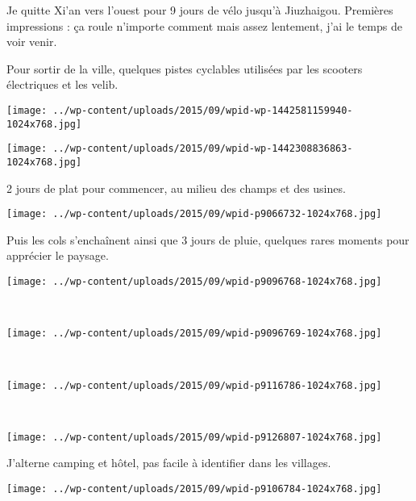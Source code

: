   Je quitte Xi'an vers l'ouest pour 9 jours de vélo jusqu'à Jiuzhaigou. Premières impressions : ça roule n'importe comment mais assez lentement, j'ai le temps de voir venir.

 Pour sortir de la ville, quelques pistes cyclables utilisées par les scooters électriques et les velib.
\begin{center} \texttt{[image: ../wp-content/uploads/2015/09/wpid-wp-1442581159940-1024x768.jpg]} \end{center}
\begin{center} \texttt{[image: ../wp-content/uploads/2015/09/wpid-wp-1442308836863-1024x768.jpg]} \end{center}
\vspace{-\topsep}
\vspace{-1.25mm}
\pagebreak

  2 jours de plat pour commencer, au milieu des champs et des usines.
\begin{center} \texttt{[image: ../wp-content/uploads/2015/09/wpid-p9066732-1024x768.jpg]} \end{center}

 Puis les cols s'enchaînent ainsi que 3 jours de pluie, quelques rares moments pour apprécier le paysage.
\begin{center} \texttt{[image: ../wp-content/uploads/2015/09/wpid-p9096768-1024x768.jpg]} \end{center}
\vspace{-\topsep}
\pagebreak

~
\begin{center} \texttt{[image: ../wp-content/uploads/2015/09/wpid-p9096769-1024x768.jpg]} \end{center}
~\\
\begin{center} \texttt{[image: ../wp-content/uploads/2015/09/wpid-p9116786-1024x768.jpg]} \end{center}
\vspace{-\topsep}
\pagebreak

~\\
\vspace{1.25mm}
\begin{center} \texttt{[image: ../wp-content/uploads/2015/09/wpid-p9126807-1024x768.jpg]} \end{center}

 J'alterne camping et hôtel, pas facile à identifier dans les villages.
\begin{center} \texttt{[image: ../wp-content/uploads/2015/09/wpid-p9106784-1024x768.jpg]} \end{center}
\vspace{-\topsep}
\pagebreak


